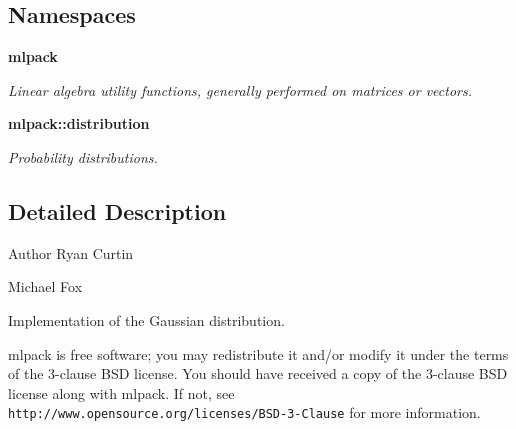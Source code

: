\subsection*{Namespaces}
\begin{DoxyCompactItemize}
\item 
 \textbf{ mlpack}
\begin{DoxyCompactList}\small\item\em Linear algebra utility functions, generally performed on matrices or vectors. \end{DoxyCompactList}\item 
 \textbf{ mlpack\+::distribution}
\begin{DoxyCompactList}\small\item\em Probability distributions. \end{DoxyCompactList}\end{DoxyCompactItemize}


\subsection{Detailed Description}
\begin{DoxyAuthor}{Author}
Ryan Curtin 

Michael Fox
\end{DoxyAuthor}
Implementation of the Gaussian distribution.

mlpack is free software; you may redistribute it and/or modify it under the terms of the 3-\/clause B\+SD license. You should have received a copy of the 3-\/clause B\+SD license along with mlpack. If not, see {\tt http\+://www.\+opensource.\+org/licenses/\+B\+S\+D-\/3-\/\+Clause} for more information. 